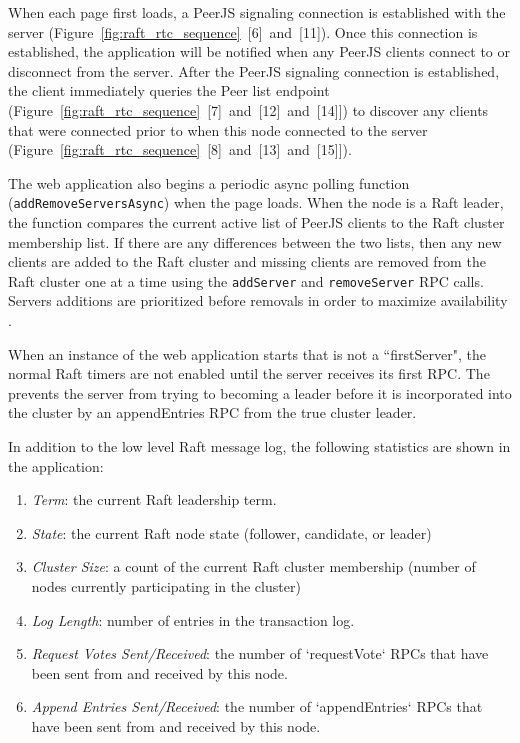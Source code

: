 \documentclass[9pt]{extarticle}
\begin{document}
\begin{multicols}{2}
When each page first loads, a PeerJS signaling connection is
established with the server
(Figure~\ref{fig:raft_rtc_sequence}~[6]~and~[11]). Once this
connection is established, the application will be notified when any
PeerJS clients connect to or disconnect from the server.  After the
PeerJS signaling connection is established, the client immediately
queries the Peer list endpoint
(Figure~\ref{fig:raft_rtc_sequence}~[7]~and~[12]~and~[14]]) to discover
any clients that were connected prior to when this node connected to
the server (Figure~\ref{fig:raft_rtc_sequence}~[8]~and~[13]~and~[15]]).

The web application also begins a periodic async polling function
(\texttt{addRemoveServersAsync}) when the page loads. When the node is a Raft
leader, the function compares the current active list of PeerJS clients to
the Raft cluster membership list. If there are any differences between
the two lists, then any new clients are added to the Raft cluster and
missing clients are removed from the Raft cluster one at a time using
the \texttt{addServer} and \texttt{removeServer} RPC calls. Servers
additions are prioritized before removals 
in order to maximize availability
\cite[Section~4.4]{raft_thesis:ongaro14}.

When an instance of the web application starts that is not
a ``firstServer", the normal Raft timers are not enabled until the
server receives its first RPC. The prevents the server from
trying to becoming a leader before it is incorporated into the cluster
by an appendEntries RPC from the true cluster leader.

In addition to the low level Raft message log, the following
statistics are shown in the application:

\begin{enumerate}
\item \emph{Term}: the current Raft leadership term.
\item \emph{State}: the current Raft node state (follower, candidate,
    or leader)
\item \emph{Cluster Size}: a count of the current Raft cluster
    membership (number of nodes currently participating in the
    cluster)
\item \emph{Log Length}: number of entries in the transaction log.
\item \emph{Request Votes Sent/Received}: the number of `requestVote`
    RPCs that have been sent from and received by this node.
\item \emph{Append Entries Sent/Received}: the number of
    `appendEntries` RPCs that have been sent from and received by this
    node.
\end{enumerate}


\end{multicols}
\end{document}
